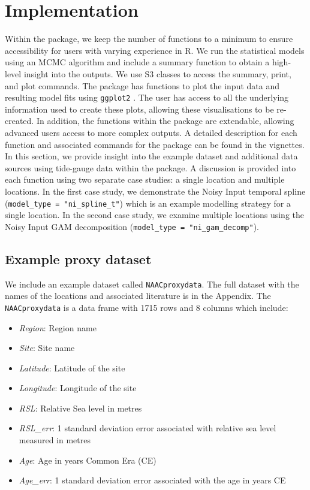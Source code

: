 \section{Implementation}\label{implementation}
Within the package, we keep the number of functions to a minimum to ensure accessibility for users with varying experience in R. We run the statistical models using an MCMC algorithm and include a summary function to obtain a high-level insight into the outputs. We use S3 classes to access the summary, print, and plot commands. The package has functions to plot the input data and resulting model fits using \texttt{ggplot2} \citep{Wickham2016}. The user has access to all the underlying information used to create these plots, allowing these visualisations to be re-created. In addition, the functions within the package are extendable, allowing advanced users access to more complex outputs. A detailed description for each function and associated commands for the  package can be found in the vignettes.
In this section, we provide insight into the example dataset and additional data sources using tide-gauge data within the  package. A discussion is provided into each function using two separate case studies: a single location and multiple locations. In the first case study, we demonstrate the Noisy Input temporal spline (\texttt{model\_type\ =\ "ni\_spline\_t"}) which is an example modelling strategy for a single location. In the second case study, we examine multiple locations using the Noisy Input GAM decomposition (\texttt{model\_type\ =\ "ni\_gam\_decomp"}).
\subsection{Example proxy dataset}\label{exampledataset}
We include an example dataset called \texttt{NAACproxydata}. The full dataset with the names of the locations and associated literature is in the Appendix. The \texttt{NAACproxydata} is a data frame with 1715 rows and 8 columns which include:
\begin{itemize}
\tightlist
\item
  \emph{Region}: Region name
\item
  \emph{Site}: Site name
\item
  \emph{Latitude}: Latitude of the site
\item
  \emph{Longitude}: Longitude of the site
\item
  \emph{RSL}: Relative Sea level in metres
\item
  \emph{RSL\_err}: 1 standard deviation error associated with relative sea level measured in metres
\item
  \emph{Age}: Age in years Common Era (CE)
\item
  \emph{Age\_err}: 1 standard deviation error associated with the age in years CE
\end{itemize}
